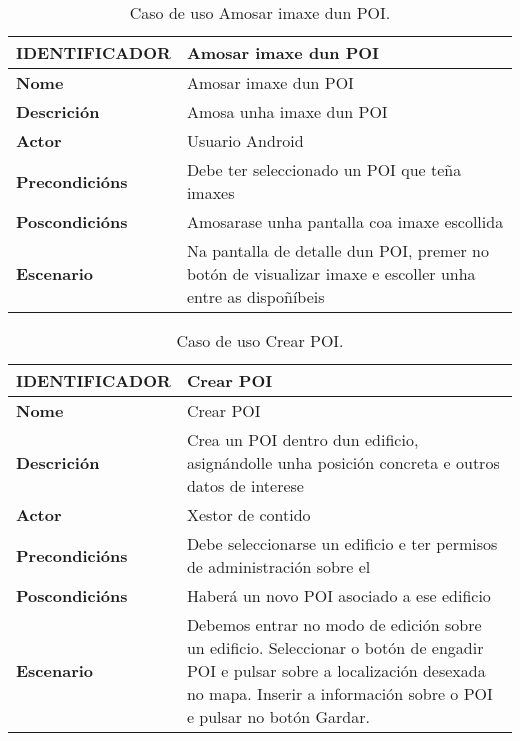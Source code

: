 \begin{table}[tbh]
	\begin{tabular}{|l|p{10cm}|}
		\hline 
		\textbf{IDENTIFICADOR}	& \textbf{Amosar imaxe dun POI} \\ 
		\hline 
		\textbf{Nome} & Amosar imaxe dun POI \\ 
		\hline 
		\textbf{Descrición} & Amosa unha imaxe dun POI \\ 
		\hline 
		\textbf{Actor} & Usuario Android \\ 
		\hline 
		\textbf{Precondicións} & Debe ter seleccionado un POI que teña imaxes \\ 
		\hline 
		\textbf{Poscondicións} & Amosarase unha pantalla coa imaxe escollida \\ 
		\hline 
		\textbf{Escenario} & Na pantalla de detalle dun POI, premer no botón de visualizar imaxe e escoller unha entre as dispoñíbeis \\ 
		\hline 
	\end{tabular}
	\caption{Caso de uso Amosar imaxe dun POI.}
	\label{tab:cuAmosarImaxePOI}
\end{table}

\begin{table}[tbh]
	\begin{tabular}{|l|p{10cm}|}
		\hline 
		\textbf{IDENTIFICADOR}	& \textbf{Crear POI} \\ 
		\hline 
		\textbf{Nome} & Crear POI \\ 
		\hline 
		\textbf{Descrición} & Crea un POI dentro dun edificio, asignándolle unha posición concreta e outros datos de interese \\ 
		\hline 
		\textbf{Actor} & Xestor de contido \\ 
		\hline 
		\textbf{Precondicións} & Debe seleccionarse un edificio e ter permisos de administración sobre el \\ 
		\hline 
		\textbf{Poscondicións} & Haberá un novo POI asociado a ese edificio \\ 
		\hline 
		\textbf{Escenario} & Debemos entrar no modo de edición sobre un edificio. Seleccionar o botón de engadir POI e pulsar sobre a localización desexada no mapa. Inserir a información sobre o POI e pulsar no botón Gardar. \\ 
		\hline 
	\end{tabular}
	\caption{Caso de uso Crear POI.}
	\label{tab:cuCrearPOI}
\end{table}

